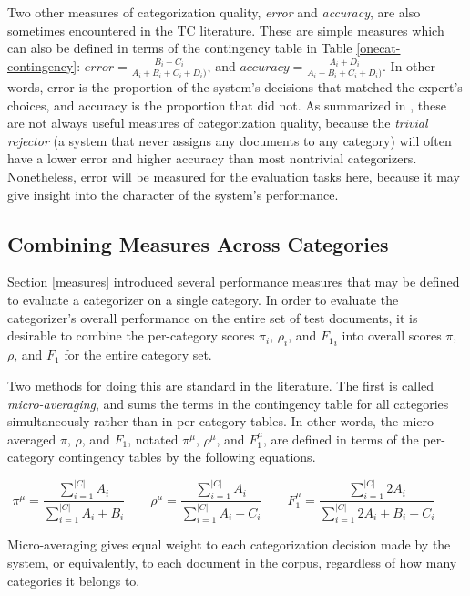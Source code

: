 Two other measures of categorization quality, \emph{error} and
\emph{accuracy}, are also sometimes encountered in the TC literature.
These are simple measures which can also be defined in terms of the
contingency table in Table \ref{onecat-contingency}: $error =
\frac{B_i+C_i}{A_i+B_i+C_i+D_i)}$, and $accuracy =
\frac{A_i+D_i}{A_i+B_i+C_i+D_i)}$.  In other words, error is the
proportion of the system's decisions that matched the expert's
choices, and accuracy is the proportion that did not.  As summarized
in \cite[p. 34]{sebastiani:02}, these are not always useful measures
of categorization quality, because the \emph{trivial rejector} (a
system that never assigns any documents to any category) will often
have a lower error and higher accuracy than most nontrivial
categorizers.  Nonetheless, error will be measured for the evaluation
tasks here, because it may give insight into the character of the
system's performance.


\subsection{Combining Measures Across Categories}
\label{combining-measures}

Section \ref{measures} introduced several performance measures that
may be defined to evaluate a categorizer on a single category.  In
order to evaluate the categorizer's overall performance on the entire
set of test documents, it is desirable to combine the per-category
scores $\pi_i$, $\rho_i$, and ${F_1}_i$ into overall scores $\pi$,
$\rho$, and $F_1$ for the entire category set.

Two methods for doing this are standard in the literature.  The first
is called \emph{micro-averaging}, and sums the terms in the
contingency table for all categories simultaneously rather than in
per-category tables.  In other words, the micro-averaged $\pi$,
$\rho$, and $F_1$, notated $\pi^\mu$, $\rho^\mu$, and $F^\mu_1$, are
defined in terms of the per-category contingency tables by the
following equations.

\begin{displaymath}
 \pi^\mu = \frac{\sum_{i=1}^{|C|}{A_i}} {\sum_{i=1}^{|C|}{A_i+B_i}} \qquad
\rho^\mu = \frac{\sum_{i=1}^{|C|}{A_i}} {\sum_{i=1}^{|C|}{A_i+C_i}} \qquad
 F^\mu_1 = \frac{\sum_{i=1}^{|C|}{2 A_i}} {\sum_{i=1}^{|C|}{2 A_i+B_i+C_i}} \qquad
\end{displaymath}

Micro-averaging gives equal weight to each categorization decision
made by the system, or equivalently, to each document in the corpus,
regardless of how many categories it belongs to.

